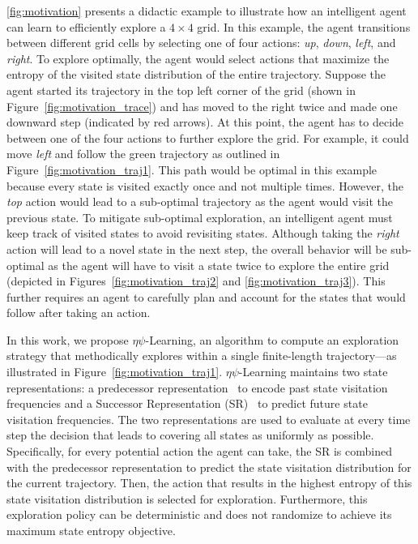\documentclass{article}
\theoremstyle{plain}
\theoremstyle{definition}
\theoremstyle{remark}
\newcommand{\alg}{$\eta$$\psi$-Learning}
\begin{document}
\autoref{fig:motivation} presents a didactic example to illustrate how an intelligent agent can learn to efficiently explore a $4 \times 4$ grid.
In this example, the agent transitions between different grid cells by selecting one of four actions: \emph{up}, \emph{down}, \emph{left}, and \emph{right}.
To explore optimally, the agent would select actions that maximize the entropy of the visited state distribution of the entire trajectory.
Suppose the agent started its trajectory in the top left corner of the grid (shown in Figure~\ref{fig:motivation_trace}) and has moved to the right twice and made one downward step (indicated by red arrows). 
At this point, the agent has to decide between one of the four actions to further explore the grid.
For example, it could move \emph{left} and follow the green trajectory as outlined in Figure~\ref{fig:motivation_traj1}.
This path would be optimal in this example because every state is visited exactly once and not multiple times.
However, the \emph{top} action would lead to a sub-optimal trajectory as the agent would visit the previous state.
To mitigate sub-optimal exploration, an intelligent agent must keep track of visited states to avoid revisiting states. 
Although taking the \emph{right} action will lead to a novel state in the next step, the overall behavior will be sub-optimal as the agent will have to visit a state twice to explore the entire grid (depicted in Figures~\ref{fig:motivation_traj2} and \ref{fig:motivation_traj3}). 
This further requires an agent to carefully plan and account for the states that would follow after taking an action. 

In this work, we propose \alg{}, an algorithm to compute an exploration strategy that methodically explores within a single finite-length trajectory---as illustrated in Figure~\ref{fig:motivation_traj1}.
\alg{} maintains two state representations: a predecessor representation~\cite{vanhasselt2021expectedeligibilitytraces,bailey2022predecessor} to encode past state visitation frequencies and a Successor Representation (SR)~\cite{dayan1993improving} to predict future state visitation frequencies.
The two representations are used to evaluate at every time step the decision that leads to covering all states as uniformly as possible.
Specifically, for every potential action the agent can take, the SR is combined with the predecessor representation to predict the state visitation distribution for the current trajectory.
Then, the action that results in the highest entropy of this state visitation distribution is selected for exploration.
Furthermore, this exploration policy can be deterministic and does not randomize to achieve its maximum state entropy objective. 
\end{document}
